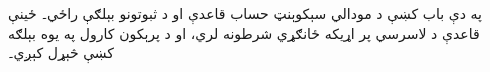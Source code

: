 \documentclass[../../../include/open-logic-chapter]{subfiles}
\begin{document}
\begin{editorial}
  په دې باب کښې د مودالي سېکوېنټ حساب قاعدې او د ثبوتونو
  بېلګې راځي۔ ځينې قاعدې د لاسرسي پر اړيکه ځانګړي شرطونه
  لري، او د پرېکون کارول په يوه بېلګه کښې څېړل کېږي۔
\end{editorial}


\OLEndChapterHook
\end{document}
